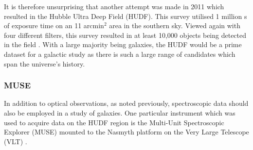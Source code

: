 \documentclass[12pt, twocolumn]{revtex4}    %
\begin{document}
It is therefore unsurprising that another attempt was made in 2011 which resulted in the Hubble Ultra Deep Field (HUDF). This survey utilised 1 million s of exposure time on an 11 arcmin$^2$ area in the southern sky. Viewed again with four different filters, this survey resulted in at least 10,000 objects being detected in the field \citep{beckwith_hudf}. With a large majority being galaxies, the HUDF would be a prime dataset for a galactic study as there is such a large range of candidates which span the universe's history. 



\subsubsection{MUSE}

In addition to optical observations, as noted previously, spectroscopic data should also be employed in a study of galaxies. One particular instrument which was used to acquire data on the HUDF region is the Multi-Unit Spectroscopic Explorer (MUSE) mounted to the Nasmyth platform on the Very Large Telescope (VLT) \citep{bacon_muse_proposal}. 

\end{document}
